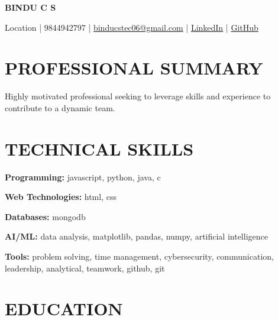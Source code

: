 \documentclass[10pt,a4paper]{article}
\begin{document}

\begin{center}

{\LARGE \textbf{BINDU C S}}

\vspace{2pt}

Location |
9844942797 |
\href{mailto:binducstec06@gmail.com}{binducstec06@gmail.com} |
\href{https://linkedin.com/in/just-da-way-im-}{LinkedIn} |
\href{https://github.com/just-da-way-im}{GitHub}

\end{center}


\section*{PROFESSIONAL SUMMARY}

Highly motivated professional seeking to leverage skills and experience to contribute to a dynamic team.


\section*{TECHNICAL SKILLS}

\textbf{Programming:} javascript, python, java, c

\textbf{Web Technologies:} html, css

\textbf{Databases:} mongodb

\textbf{AI/ML:} data analysis, matplotlib, pandas, numpy, artificial intelligence

\textbf{Tools:} problem solving, time management, cybersecurity, communication, leadership, analytical, teamwork, github, git


\section*{EDUCATION}
\end{document}
